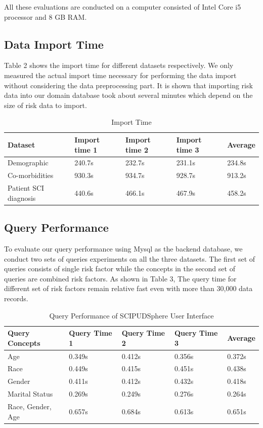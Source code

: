 \documentclass{amia}
\begin{document}
All these evaluations are conducted on a computer consisted of Intel Core i5 processor and 8 GB RAM.
\subsection{Data Import Time}

Table 2 shows the import time for different datasets respectively. We only measured the actual import time necessary for performing the data import without considering the data preprocessing part. It is shown that importing risk data into our domain database took about several minutes which depend on the size of risk data to import.

\begin{table}[!ht]
\centering
\caption{Import Time}
  \begin{tabular}{|l|l|l|l|l|}
  \hline
    \textbf{Dataset}  & \textbf{Import time 1} & \textbf{Import time 2} & \textbf{Import time 3} & \textbf{Average} \\ \hline
    Demographic & 240.7s & 232.7s & 231.1s & 234.8s  \\ \hline
    Co-morbidities  & 930.3s & 934.7s & 928.7s & 913.2s  \\ \hline
    Patient SCI diagnosis  & 440.6s & 466.1s & 467.9s & 458.2s \\ \hline
  \end{tabular}
\end{table}

\subsection{Query Performance}
To evaluate our query performance using Mysql as the backend database, we conduct two sets of queries experiments on all the three datasets. The first set of queries consists of single risk factor while the concepts in the second set of queries are combined risk factors. As shown in Table 3, The query time for different set of risk factors remain relative fast even with more than 30,000 data records.

\begin{table}[!ht]
\centering
\caption{Query Performance of SCIPUDSphere User Interface}
  \begin{tabular}{|l|l|l|l|l|}
  \hline
    \textbf{Query Concepts}  & \textbf{Query Time 1} & \textbf{Query Time 2} & \textbf{Query Time 3} & \textbf{Average} \\ \hline
    Age & 0.349s & 0.412s & 0.356s & 0.372s \\ \hline
    Race & 0.449s & 0.415s & 0.451s & 0.438s \\ \hline
    Gender   & 0.411s & 0.412s & 0.432s & 0.418s \\ \hline
    Marital Status   & 0.269s & 0.249s & 0.276s & 0.264s \\ \hline
    Race, Gender, Age & 0.657s & 0.684s & 0.613s & 0.651s \\ \hline
  \end{tabular}
\end{table}
\end{document}
